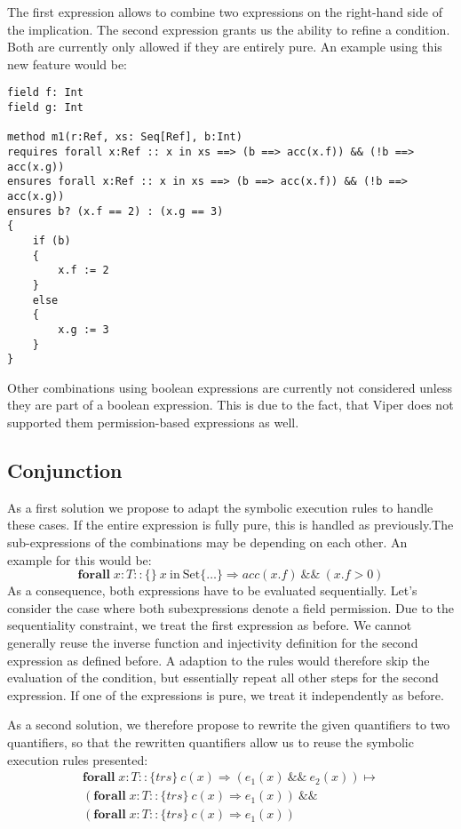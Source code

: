 \documentclass[12pt]{article}
\begin{document}
The first expression allows to combine two expressions on the right-hand side of the implication. The second expression  grants us the ability to refine a condition. Both are currently only allowed if they are entirely pure. An example using this new feature would be: 

\begin{lstlisting}
field f: Int
field g: Int

method m1(r:Ref, xs: Seq[Ref], b:Int)
requires forall x:Ref :: x in xs ==> (b ==> acc(x.f)) && (!b ==> acc(x.g))
ensures forall x:Ref :: x in xs ==> (b ==> acc(x.f)) && (!b ==> acc(x.g))
ensures b? (x.f == 2) : (x.g == 3)
{
    if (b)
    {
        x.f := 2
    }
    else
    {
        x.g := 3
    }
}
\end{lstlisting}

Other combinations using boolean expressions are currently not considered unless they are part of a boolean expression. This is due to the fact, that Viper does not supported them permission-based expressions as well.

\subsection{Conjunction}
As a first solution we propose to adapt the symbolic execution rules to handle these cases.
If the entire expression is fully pure, this is handled as previously.The sub-expressions of the combinations may be depending on each other. An example for this would be: 
\begin{equation}
\label{eq1}
	\mathbf{forall} \; x:T :: \{\}\  x\ \mathrm{in \ Set} \{\dots\} \Rightarrow acc(x.f) \ \&\& \ (x.f > 0)
\end{equation}
As a consequence, both expressions have to be evaluated sequentially. 
Let's consider the case where both subexpressions denote a field permission. Due to the sequentiality constraint, we treat the first expression as before. We cannot generally reuse the inverse function and injectivity definition for the second expression as defined before. A adaption to the rules would therefore skip the evaluation of the condition, but essentially repeat all other steps for the second expression.
If one of the expressions is pure, we treat it independently as before.

As a second solution, we therefore propose to rewrite the given quantifiers to two quantifiers, so that the rewritten quantifiers allow us to reuse the symbolic execution rules presented: 
\begin{equation}
\begin{aligned}
	\mathbf{forall} \; x:T :: \{trs\}\  c(x) \Rightarrow (e_1(x)\ \&\& \ e_2(x))  \mapsto \\
	(\mathbf{forall} \; x:T :: \{trs\}\   c(x)  \Rightarrow e_1(x)) \ \&\& \\
	(\mathbf{forall} \; x:T :: \{trs\}\   c(x) \Rightarrow  e_1(x))
\end{aligned}
\end{equation}
\end{document}
